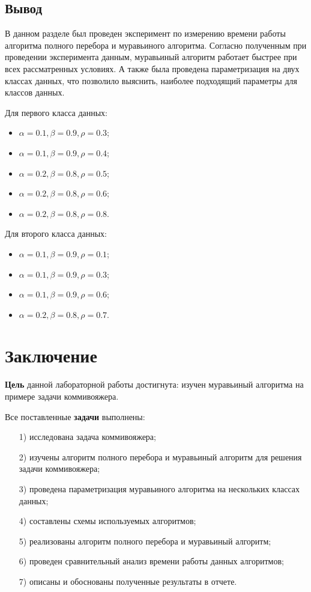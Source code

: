 \documentclass[a4paper,14pt, unknownkeysallowed]{extreport}
\begin{document}
\section*{Вывод}
	
В данном разделе был проведен эксперимент по измерению времени работы алгоритма полного перебора и муравьиного алгоритма. 
Согласно полученным при проведении эксперимента данным, муравьиный алгоритм работает быстрее при всех рассматренных условиях.
А также была проведена параметризация на двух классах данных, что позволило выяснить, наиболее подходящий параметры для классов данных.

Для первого класса данных:

\begin{itemize}
    \item $\alpha = 0.1, \beta = 0.9, \rho = 0.3$;
    \item $\alpha = 0.1, \beta = 0.9, \rho = 0.4$;
    \item $\alpha = 0.2, \beta = 0.8, \rho = 0.5$;
    \item $\alpha = 0.2, \beta = 0.8, \rho = 0.6$;
    \item $\alpha = 0.2, \beta = 0.8, \rho = 0.8$.
\end{itemize}

Для второго класса данных:

\begin{itemize}
    \item $\alpha = 0.1, \beta = 0.9, \rho = 0.1$;
    \item $\alpha = 0.1, \beta = 0.9, \rho = 0.3$;
    \item $\alpha = 0.1, \beta = 0.9, \rho = 0.6$;
    \item $\alpha = 0.2, \beta = 0.8, \rho = 0.7$.
\end{itemize}
	
\chapter*{Заключение}


\textbf{Цель} данной лабораторной работы достигнута: изучен муравьиный алгоритма на примере задачи коммивояжера.

Все поставленные \textbf{задачи} выполнены:

\begin{enumerate}
	\item[1)] исследована задача коммивояжера;
	\item[2)] изучены алгоритм полного перебора и муравьиный алгоритм для решения задачи коммивояжера;
	\item[3)] проведена параметризация муравьиного алгоритма на нескольких классах данных;
	\item[4)] составлены схемы используемых алгоритмов;
	\item[5)] реализованы алгоритм полного перебора и муравьиный алгоритм;
	\item[6)] проведен сравнительный анализ времени работы данных алгоритмов;
	\item[7)] описаны и обоснованы полученные результаты в отчете.
\end{enumerate}
	
\end{document}

